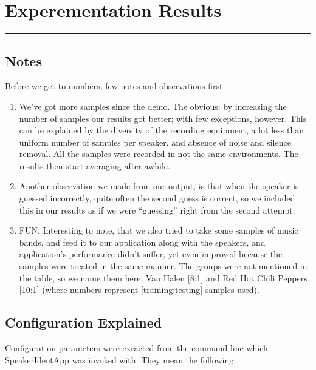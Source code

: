 \section{Experementation Results}\label{sect:results}
\noindent
\rule{7.0in}{.013in}

\subsection{Notes}

Before we get to numbers, few notes and observations first:

\begin{enumerate}

\item We've got more samples since the demo. The obvious: by increasing the number of samples our results got
      better; with few exceptions, however. This can be explained by
      the diversity of the recording equipment, a lot less than uniform
      number of samples per speaker, and absence of noise and silence
      removal. All the samples were recorded in not the same environments.
      The results then start averaging after awhile.

\item Another observation we made from our output, is that
      when the speaker is guessed incorrectly, quite often the second
      guess is correct, so we included this in our results as if we were
      ``guessing'' right from the second attempt.

\item FUN. Interesting to note, that we also tried to take some
      samples of music bands, and feed it to our application
      along with the speakers, and application's performance didn't suffer,
      yet even improved because the samples were treated in
      the same manner. The groups were not mentioned in the table,
      so we name them here: Van Halen [8:1] and Red Hot Chili Peppers [10:1] (where numbers
      represent [training:testing] samples used).

\end{enumerate}

\clearpage

\subsection{Configuration Explained}

Configuration parameters were exracted from the command line
which SpeakerIdentApp was invoked with. They mean the following:

